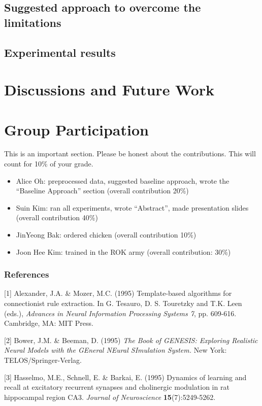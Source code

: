 \documentclass{article} %
\begin{document}
\subsection{Suggested approach to overcome the limitations}
\subsection{Experimental results}

\section{Discussions and Future Work}

\section{Group Participation}
This is an important section. Please be honest about the contributions. This will count for 10\% of your grade.
\begin{itemize}
\item
Alice Oh: preprocessed data, suggested baseline approach, wrote the ``Baseline Approach'' section (overall contribution 20\%)
\item
Suin Kim: ran all experiments, wrote ``Abstract'', made presentation slides (overall contribution 40\%)
\item
JinYeong Bak: ordered chicken (overall contribution 10\%)
\item
Joon Hee Kim: trained in the ROK army (overall contribution: 30\%)
\end{itemize}


\subsubsection*{References}

\small{
[1] Alexander, J.A. \& Mozer, M.C. (1995) Template-based algorithms
for connectionist rule extraction. In G. Tesauro, D. S. Touretzky
and T.K. Leen (eds.), {\it Advances in Neural Information Processing
Systems 7}, pp. 609-616. Cambridge, MA: MIT Press.

[2] Bower, J.M. \& Beeman, D. (1995) {\it The Book of GENESIS: Exploring
Realistic Neural Models with the GEneral NEural SImulation System.}
New York: TELOS/Springer-Verlag.

[3] Hasselmo, M.E., Schnell, E. \& Barkai, E. (1995) Dynamics of learning
and recall at excitatory recurrent synapses and cholinergic modulation
in rat hippocampal region CA3. {\it Journal of Neuroscience}
{\bf 15}(7):5249-5262.
}
\end{document}
